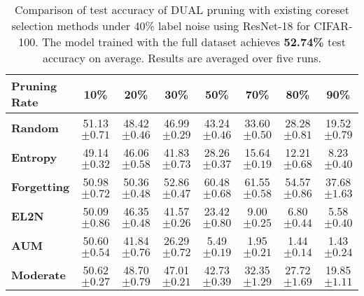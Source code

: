 \begin{table}[ht]
\caption{\label{tab:label_noise_40_cifar}Comparison of test accuracy of DUAL pruning with existing coreset selection methods under 40\% label noise using ResNet-18 for CIFAR-100. The model trained with the full dataset achieves \textbf{52.74\%} test accuracy on average. Results are averaged over five runs.}
\setlength{\tabcolsep}{3.1pt}
\centering
\begin{tabular}{lccccccc}
    \toprule
    \textbf{Pruning Rate} & \textbf{10\%} & \textbf{20\%} & \textbf{30\%} & \textbf{50\%} & \textbf{70\%} & \textbf{80\%} & \textbf{90\%} \\
    \midrule
    \textbf{Random} & 51.13 \scriptsize{$\pm 0.71 $} & 48.42 \scriptsize{$\pm 0.46 $} & 46.99 \scriptsize{$\pm 0.29 $} & 43.24 \scriptsize{$\pm 0.46 $} & 33.60 \scriptsize{$\pm 0.50 $} & 28.28 \scriptsize{$\pm 0.81 $} & 19.52 \scriptsize{$\pm 0.79 $} \\
    
    \textbf{Entropy} & 49.14 \scriptsize{$\pm 0.32 $} & 46.06 \scriptsize{$\pm 0.58 $} & 41.83 \scriptsize{$\pm 0.73 $} & 28.26 \scriptsize{$\pm 0.37 $} & 15.64  \scriptsize{$\pm 0.19 $} & 12.21 \scriptsize{$\pm 0.68 $} & 8.23 \scriptsize{$\pm 0.40 $}\\
    
    \textbf{Forgetting} & 50.98 \scriptsize{$\pm 0.72 $} & 50.36 \scriptsize{$\pm 0.48 $} & 52.86 \scriptsize{$\pm 0.47 $} & 60.48 \scriptsize{$\pm 0.68 $} & 61.55 \scriptsize{$\pm 0.58 $} & 54.57 \scriptsize{$\pm 0.86 $} & 37.68 \scriptsize{$\pm 1.63 $} \\
    
    \textbf{EL2N} & 50.09 \scriptsize{$\pm 0.86 $} & 46.35 \scriptsize{$\pm 0.48 $} & 41.57 \scriptsize{$\pm 0.26 $} & 23.42 \scriptsize{$\pm 0.80 $} & 9.00 \scriptsize{$\pm 0.25 $} & 6.80 \scriptsize{$\pm 0.44 $} & 5.58 \scriptsize{$\pm 0.40$} \\
    
    \textbf{AUM} & 50.60 \scriptsize{$\pm 0.54 $} & 41.84 \scriptsize{$\pm 0.76 $} & 26.29 \scriptsize{$\pm 0.72 $} & 5.49 \scriptsize{$\pm 0.19 $} & 1.95 \scriptsize{$\pm 0.21 $} & 1.44 \scriptsize{$\pm 0.14 $ } & 1.43 \scriptsize{$\pm 0.24 $}\\
    
    \textbf{Moderate} & 50.62 \scriptsize{$\pm 0.27 $} & 48.70 \scriptsize{$\pm 0.79 $} & 47.01  \scriptsize{$\pm 0.21 $} & 42.73 \scriptsize{$\pm 0.39 $} & 32.35 \scriptsize{$\pm 1.29 $} & 27.72 \scriptsize{$\pm 1.69 $} & 19.85 \scriptsize{$\pm 1.11 $}  \\
    

\end{tabular}
\end{table}
